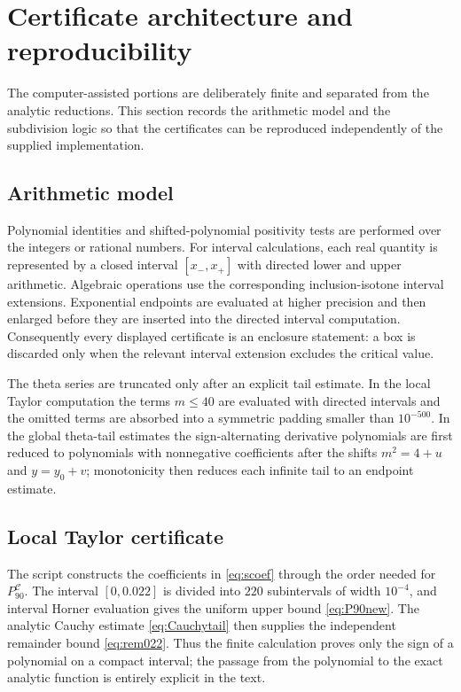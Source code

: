 \documentclass{amsart}
\numberwithin{equation}{section}
\theoremstyle{definition}
\theoremstyle{remark}
\newcommand{\Ccal}{\mathcal C}
\begin{document}
\section{Certificate architecture and reproducibility}\label{sec:certificates}
The computer-assisted portions are deliberately finite and separated from the analytic reductions.  This section records the arithmetic model and the subdivision logic so that the certificates can be reproduced independently of the supplied implementation.

\subsection{Arithmetic model}
Polynomial identities and shifted-polynomial positivity tests are performed over the integers or rational numbers.  For interval calculations, each real quantity is represented by a closed interval $[x_-,x_+]$ with directed lower and upper arithmetic.  Algebraic operations use the corresponding inclusion-isotone interval extensions.  Exponential endpoints are evaluated at higher precision and then enlarged before they are inserted into the directed interval computation.  Consequently every displayed certificate is an enclosure statement: a box is discarded only when the relevant interval extension excludes the critical value.

The theta series are truncated only after an explicit tail estimate.  In the local Taylor computation the terms $m\le40$ are evaluated with directed intervals and the omitted terms are absorbed into a symmetric padding smaller than $10^{-500}$.  In the global theta-tail estimates the sign-alternating derivative polynomials are first reduced to polynomials with nonnegative coefficients after the shifts $m^2=4+u$ and $y=y_0+v$; monotonicity then reduces each infinite tail to an endpoint estimate.

\subsection{Local Taylor certificate}
The script  constructs the coefficients in \eqref{eq:scoef} through the order needed for $P_{90}^{\Ccal}$.  The interval $[0,0.022]$ is divided into $220$ subintervals of width $10^{-4}$, and interval Horner evaluation gives the uniform upper bound \eqref{eq:P90new}.  The analytic Cauchy estimate \eqref{eq:Cauchytail} then supplies the independent remainder bound \eqref{eq:rem022}.  Thus the finite calculation proves only the sign of a polynomial on a compact interval; the passage from the polynomial to the exact analytic function is entirely explicit in the text.
\end{document}
